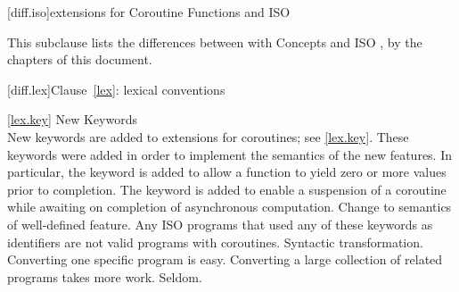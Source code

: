 
[diff.iso]{\Cpp extensions for Coroutine Functions and ISO }

\pnum
This subclause lists the differences between \Cpp with Concepts
and ISO \Cpp, by the chapters of this document.

[diff.lex]{Clause~\ref{lex}: lexical conventions}

\ref{lex.key}
\change New Keywords\\
New keywords are added to \Cpp extensions for coroutines;
see \ref{lex.key}.
\rationale
These keywords were added in order to implement the semantics of the
new features. In particular, the  keyword is added
to allow a function to yield zero or more values prior to completion. The  keyword is 
added to enable a suspension of a coroutine while
awaiting on completion of asynchronous computation.
\effect
Change to semantics of well-defined feature.
Any ISO \Cpp programs that used any of these keywords as identifiers
are not valid \Cpp programs with coroutines.
\difficulty
Syntactic transformation.
Converting one specific program is easy.
Converting a large collection
of related programs takes more work.
\howwide
Seldom.


